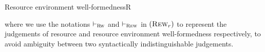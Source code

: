 \begin{rules}{Resource environment well-formedness}{\vdash R}
    \begin{minipage}{.25\linewidth}
        \infrule[Rew$_{-}$]{
             \\
        }{
            \vdash -
        }
    \end{minipage}
    \begin{minipage}{.50\linewidth}
    \end{minipage}
\end{rules}
\vspace{0.5\baselineskip}
where we use the notations $\vdash_{\textsc{Rw}}$ and $\vdash_{\textsc{Rew}}$ in $(\textsc{Rew}_r)$ to represent the  judgements of resource and resource environment well-formedness respectively, to avoid ambiguity between two syntactically indistinguishable judgements.


